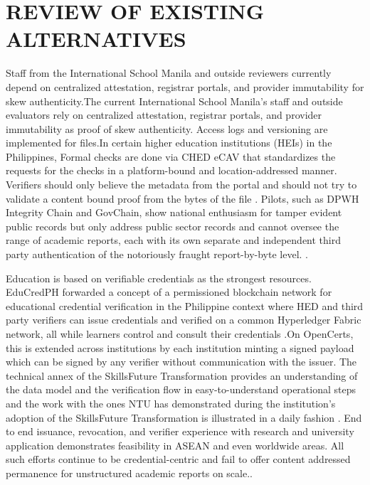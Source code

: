 \section{REVIEW OF EXISTING ALTERNATIVES}
Staff from the International School Manila and outside reviewers currently depend on centralized attestation, registrar portals, and provider immutability for skew authenticity.The current International School Manila's staff and outside evaluators rely on centralized attestation, registrar portals, and provider immutability as proof of skew authenticity. Access logs and versioning are implemented for files.In certain higher education institutions (HEIs) in the Philippines, Formal checks are done via CHED eCAV that standardizes the requests for the checks in a platform-bound and location-addressed manner. Verifiers should only believe the metadata from the portal and should not try to validate a content bound proof from the bytes of the file \citep{CommissionOnHigherEducationND}. Pilots, such as DPWH Integrity Chain and GovChain, show national enthusiasm for tamper evident public records but only address public sector records and cannot oversee the range of academic reports, each with its own separate and independent third party authentication of the notoriously fraught report-by-byte level. \citep{DPWH2025,BetterGovernmentPhilippinesND}.

Education is based on verifiable credentials as the strongest resources. EduCredPH forwarded a concept of a permissioned blockchain network for educational credential verification in the Philippine context where HED and third party verifiers can issue credentials and verified on a common Hyperledger Fabric network, all while learners control and consult their credentials \citep{EduCredPH2024}.On OpenCerts, this is extended across institutions by each institution minting a signed payload which can be signed by any verifier without communication with the issuer. The technical annex of the SkillsFuture Transformation provides an understanding of the data model and the verification flow in easy-to-understand operational steps and the work with the ones NTU has demonstrated during the institution's adoption of the SkillsFuture Transformation is illustrated in a daily fashion \citep{GovTech2019,SkillsFuture2018,NTUND}. End to end issuance, revocation, and verifier experience with research and university application demonstrates feasibility in ASEAN and even worldwide areas. All such efforts continue to be credential-centric and fail to offer content addressed permanence for unstructured academic reports on scale.\citep{Naji2023,MohebiAghdam2024}.

